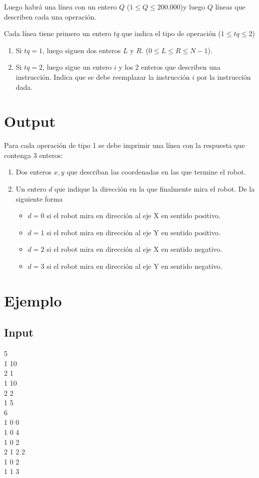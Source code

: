 \documentclass{article}
\begin{document}
Luego habrá una línea con un entero $Q$ ($1 \leq Q \leq 200.000$)y luego $Q$ líneas que describen cada una operación.
 
Cada línea tiene primero un entero $tq$ que indica el tipo de operación ($1 \leq tq \leq 2$)
 
\begin{enumerate}
    \item Si $tq = 1$, luego siguen dos enteros $L$ y $R$. ($0 \leq L \leq R \leq N-1$).
    \item Si $tq = 2$, luego sigue un entero $i$ y los 2 enteros que describen una instrucción. Indica que se debe reemplazar la instrucción $i$ por la instrucción dada.
\end{enumerate}
 
\section{Output}
 
Para cada operación de tipo 1 se debe imprimir una línea con la respuesta que contenga 3 enteros:
\begin{enumerate}
    \item Dos enteros $x,y$ que describan las coordenadas en las que termine el robot.
    \item Un entero $d$ que indique la dirección en la que finalmente mira el robot. De la siguiente forma
    \begin{itemize}
        \item $d = 0$ si el robot mira en dirección al eje X en sentido positivo.
        \item $d = 1$ si el robot mira en dirección al eje Y en sentido positivo.
        \item $d = 2$ si el robot mira en dirección al eje X en sentido negativo.
        \item $d = 3$ si el robot mira en dirección al eje Y en sentido negativo.
    \end{itemize}
\end{enumerate}
\section{Ejemplo}

\subsection{Input}
5\\
1 10\\
2 1\\
1 10\\
2 2\\
1 5\\
6\\
1 0 0\\
1 0 4\\
1 0 2\\
2 1 2 2\\
1 0 2\\
1 1 3
\end{document}
